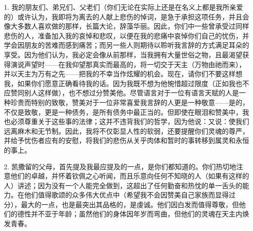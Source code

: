 \par

1. 我的朋友们、弟兄们、父老们（你们无论在实际上还是在名义上都是我所亲爱的）或许认为，我即将为离去的人献上悲伤的悼词，是急于承担这项任务，并且会像大多数人喜欢做的那样，长篇大论，辞藻华丽。因此，你们中一些曾承受过同样悲伤的人，准备加入我的哀悼和悲叹，以便在我的悲痛中哀悼你们自己的忧伤，并学会因朋友的苦难而感到痛苦；而另一些人则期待以聆听我言辞的方式满足耳朵的享受。因为他们认为，我必定会像从前那样，当我拥有大量世俗之物，且最渴望获得演说声望时——在我仰望那真实而最高的，将一切交于天主（万物由祂而来），并以天主为万有之先——把我的不幸当作炫耀的机会。现在，请你们不要这样想我，如果你们愿意正确看待我的话。因为我既不想为他惋惜超过限度（正如我也不应赞同别人这样做），也不想过分赞美他。尽管语言对于一位有语言天赋的人是一种珍贵而特别的致敬，赞美对于一位非常喜爱我言辞的人更是一种敬意——是的，不仅是致敬，更是一种债务，是所有债务中最正当的。但即使在眼泪和赞美中，我也必须尊重关于这些事的法律；这并不违背我们的哲学，因为他说：又说：使我们远离麻木和无节制。因此，我将不仅彰显人性的软弱，还要提醒你们灵魂的尊严，并给予忧伤者应有的安慰，将我们的悲伤从关乎肉体和暂时的事转移到属灵和永恒的事上。\par

2. 凯撒留的父母，首先提及我最应提及的一点，是你们都知道的。你们热切地注意他们的卓越，并怀着钦佩之心听闻，而且乐意向任何不知晓的人（如果有这样的人）讲述；因为没有一个人能完全做到，这超出了任何勤奋和热忱的单一舌头的能力。在他们值得歌颂的众多伟大优点中（希望我不会因赞美自己家族而显得过分），最大的一点，也是最突出其品格的，是虔诚。他们因白发而值得尊敬，但他们的德性并不亚于年龄；虽然他们的身体因年岁而弯曲，但他们的灵魂在天主内焕发青春。\par

